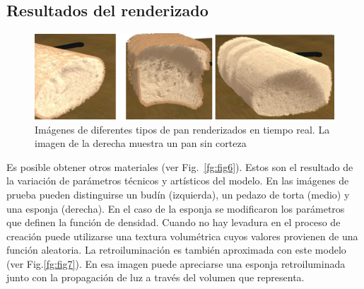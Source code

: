 


%

\subsection{Resultados del renderizado}


\begin{figure}[htb!]
  \centerline{\includegraphics[width=13cm]{fig5}}
  \caption{Imágenes de diferentes tipos de pan renderizados en tiempo real. La imagen de la derecha muestra un pan sin corteza}
  \label{fg:fig5}
\end{figure}

Es posible obtener otros materiales (ver Fig.~\ref{fg:fig6}). Estos son el resultado de la variación de parámetros técnicos y artísticos del modelo. En las imágenes de prueba pueden distinguirse un budín (izquierda), un pedazo de torta (medio) y una esponja (derecha). En el caso de la esponja se modificaron los parámetros que definen la función de densidad. Cuando no hay levadura en el proceso de creación puede utilizarse una textura volumétrica cuyos valores provienen de una función aleatoria. La retroiluminación es también aproximada con este modelo (ver Fig.\ref{fg:fig7}). En esa imagen puede apreciarse una esponja retroiluminada junto con la propagación de luz a través del volumen que representa.

